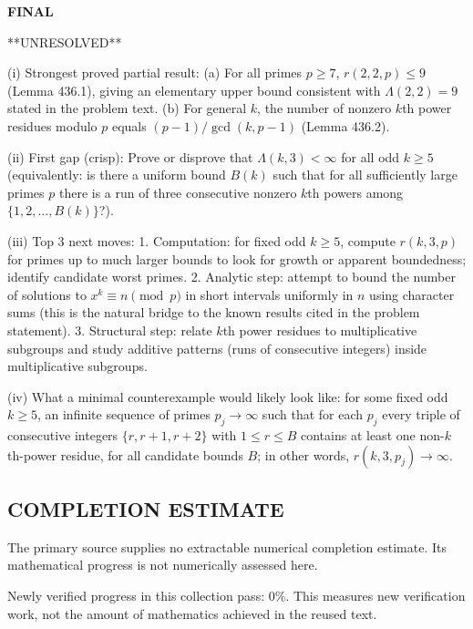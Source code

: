\medskip
\noindent\textbf{FINAL}

**UNRESOLVED**

(i) Strongest proved partial result: (a) For all primes $p\ge 7$, $r(2,2,p)\le 9$ (Lemma 436.1), giving an elementary upper bound consistent with $\Lambda(2,2)=9$ stated in the problem text. (b) For general $k$, the number of nonzero $k$th power residues modulo $p$ equals $(p-1)/\gcd(k,p-1)$ (Lemma 436.2).

(ii) First gap (crisp): Prove or disprove that $\Lambda(k,3)<\infty$ for all odd $k\ge 5$ (equivalently: is there a uniform bound $B(k)$ such that for all sufficiently large primes $p$ there is a run of three consecutive nonzero $k$th powers among $\{1,2,\dots,B(k)\}$?).

(iii) Top 3 next moves:
1. Computation: for fixed odd $k\ge 5$, compute $r(k,3,p)$ for primes up to much larger bounds to look for growth or apparent boundedness; identify candidate worst primes.
2. Analytic step: attempt to bound the number of solutions to $x^k\equiv n\pmod p$ in short intervals uniformly in $n$ using character sums (this is the natural bridge to the known results cited in the problem statement).
3. Structural step: relate $k$th power residues to multiplicative subgroups and study additive patterns (runs of consecutive integers) inside multiplicative subgroups.

(iv) What a minimal counterexample would likely look like: for some fixed odd $k\ge 5$, an infinite sequence of primes $p_j\to\infty$ such that for each $p_j$ every triple of consecutive integers $\{r,r+1,r+2\}$ with $1\le r\le B$ contains at least one non-$k$th-power residue, for all candidate bounds $B$; in other words, $r(k,3,p_j)\to\infty$.




\subsection*{COMPLETION ESTIMATE}
The primary source supplies no extractable numerical completion estimate. Its mathematical progress is not numerically assessed here.

Newly verified progress in this collection pass: $0\%$. This measures new verification work, not the amount of mathematics achieved in the reused text.
